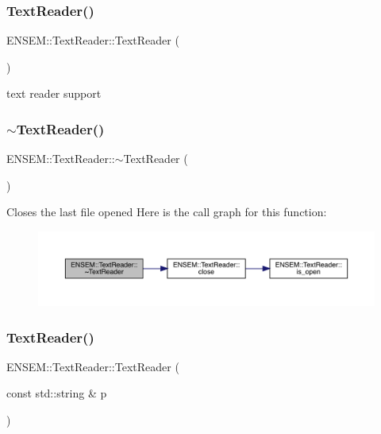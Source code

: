 \subsubsection{\texorpdfstring{TextReader()}{TextReader()}\hspace{0.1cm}{\footnotesize\ttfamily [1/6]}}
{\footnotesize\ttfamily E\+N\+S\+E\+M\+::\+Text\+Reader\+::\+Text\+Reader (\begin{DoxyParamCaption}{ }\end{DoxyParamCaption})}



text reader support 

\mbox{\label{classENSEM_1_1TextReader_a95ed1b116302f6fc2532451bd5df2dbd}} 
\subsubsection{\texorpdfstring{$\sim$TextReader()}{~TextReader()}\hspace{0.1cm}{\footnotesize\ttfamily [1/3]}}
{\footnotesize\ttfamily E\+N\+S\+E\+M\+::\+Text\+Reader\+::$\sim$\+Text\+Reader (\begin{DoxyParamCaption}{ }\end{DoxyParamCaption})}

Closes the last file opened Here is the call graph for this function\+:\nopagebreak
\begin{figure}[H]
\begin{center}
\leavevmode
\includegraphics[width=350pt]{d4/d23/classENSEM_1_1TextReader_a95ed1b116302f6fc2532451bd5df2dbd_cgraph}
\end{center}
\end{figure}
\mbox{\label{classENSEM_1_1TextReader_a1c253bcaf58b6f01f25bb10b798f771e}} 
\subsubsection{\texorpdfstring{TextReader()}{TextReader()}\hspace{0.1cm}{\footnotesize\ttfamily [2/6]}}
{\footnotesize\ttfamily E\+N\+S\+E\+M\+::\+Text\+Reader\+::\+Text\+Reader (\begin{DoxyParamCaption}\item[{const std\+::string \&}]{p }\end{DoxyParamCaption})\hspace{0.3cm}{\ttfamily [explicit]}}

